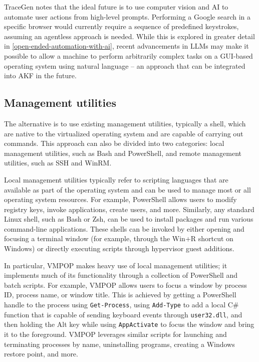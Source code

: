 TraceGen \cite{duTraceGenUserActivity2021} notes that the ideal
future is to use computer vision and AI to automate user actions from
high-level prompts. Performing a Google search in a specific browser
would currently require a sequence of predefined keystrokes, assuming an
agentless approach is needed. While this is explored in greater detail
in \autoref{open-ended-automation-with-ai},
recent advancements in LLMs may make it possible to allow a machine to
perform arbitrarily complex tasks on a GUI-based operating system using
natural language -- an approach that can be integrated into AKF in the
future.

\subsection{Management utilities}\label{management-utilities}

The alternative is to use existing management utilities, typically a
shell, which are native to the virtualized operating system and are
capable of carrying out commands. This approach can also be divided into
two categories: local management utilities, such as Bash and PowerShell,
and remote management utilities, such as SSH and WinRM.

Local management utilities typically refer to scripting languages that
are available as part of the operating system and can be used to manage
most or all operating system resources. For example, PowerShell allows
users to modify registry keys, invoke applications, create users, and
more. Similarly, any standard Linux shell, such as Bash or Zsh, can be
used to install packages and run various command-line applications.
These shells can be invoked by either opening and focusing a terminal
window (for example, through the Win+R shortcut on Windows) or directly
executing scripts through hypervisor guest additions.

In particular, VMPOP \cite{parkTREDEVMPOPCultivating2018} makes
heavy use of local management utilities; it implements much of its
functionality through a collection of PowerShell and batch scripts. For
example, VMPOP allows users to focus a window by process ID, process
name, or window title. This is achieved by getting a PowerShell handle
to the process using \passthrough{\lstinline!Get-Process!}, using
\passthrough{\lstinline!Add-Type!} to add a local C\# function that is
capable of sending keyboard events through
\passthrough{\lstinline!user32.dll!}, and then holding the Alt key while
using \passthrough{\lstinline!AppActivate!} to focus the window and
bring it to the foreground. VMPOP leverages similar scripts for
launching and terminating processes by name, uninstalling programs,
creating a Windows restore point, and more.

